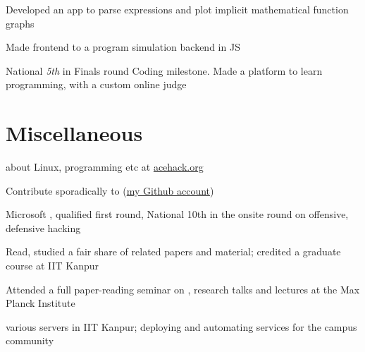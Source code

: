 \documentclass[a4paper]{deedy-resume} %
\begin{document}
\begin{minipage}[t]{0.66\textwidth}
  \sectionspace

  \runsubsection{}
  \begin{tightitemize}
  \item Developed an app to parse expressions and
    plot implicit mathematical function graphs
  \item Made frontend to a program simulation backend in JS
  \item National \textit{5th} in Finals round Coding milestone.
    Made a platform to learn programming, with a custom online judge
  \end{tightitemize}

  \section{Miscellaneous}
  \vspace{\topsep}
  \begin{tightitemize}
  \item {} about Linux, programming etc at
    \href{http://acehack.org}{acehack.org}
  \item Contribute sporadically to 
    (\href{https://github.com/sakshamsharma}{my Github account})
  \item Microsoft , qualified first round,
    National 10th in the onsite round on offensive, defensive hacking
  \item Read, studied a fair share of  related
    papers and material; credited a graduate course at IIT Kanpur
  \item Attended a full paper-reading seminar on , research talks and lectures at the Max Planck Institute
  \item {} various servers in IIT Kanpur; deploying and
    automating services for the campus community
  \end{tightitemize}

\end{minipage}



\end{document}
